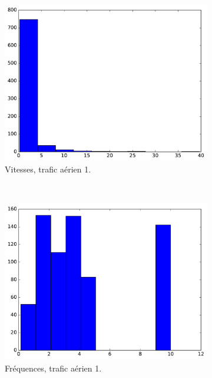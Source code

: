 \begin{appendices}
	\begin{figure}[htbp]
		\begin{subfigure}[t]{\subImgWclicks}
			\centering
			\includegraphics[width=\textwidth]{figures/ch3/mhA_filteredSpeed}
			\caption{Vitesses, trafic aérien 1.}
			\label{fig:mhA_filteredSpeed}
		\end{subfigure}
		~
		\begin{subfigure}[t]{\subImgWclicks}
			\centering
			\includegraphics[width=\textwidth]{figures/ch3/mhA_frequency}
			\caption{Fréquences, trafic aérien 1.}
			\label{fig:mhA_frequency}
		\end{subfigure}
		~
		\begin{subfigure}[t]{\subImgWclicks}

\end{subfigure}
\end{figure}
\end{appendices}
